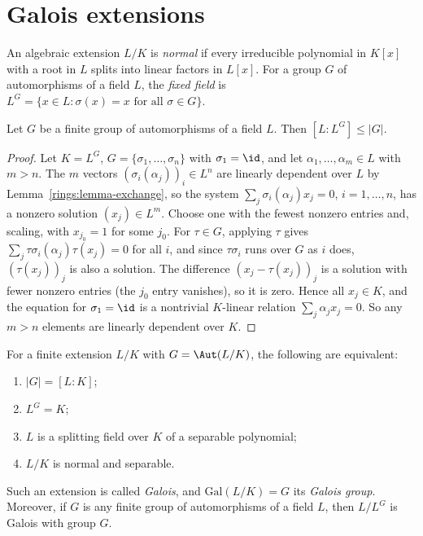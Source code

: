 \section{Galois extensions}\label{fields:section-galois}

\begin{definition}\label{fields:definition-normal}
An algebraic extension $L/K$ is \emph{normal} if every irreducible polynomial in $K[x]$
with a root in $L$ splits into linear factors in $L[x]$. For a group $G$ of automorphisms
of a field $L$, the \emph{fixed field} is $L^G = \{x \in L : \sigma(x) = x \text{ for all } \sigma \in G\}$.
\end{definition}

\begin{lemma}[Artin]\label{fields:lemma-artin}
Let $G$ be a finite group of automorphisms of a field $L$. Then $[L : L^G] \leq |G|$.
\end{lemma}

\begin{proof}
Let $K = L^G$, $G = \{\sigma_1, \ldots, \sigma_n\}$ with $\sigma_1 = \id$, and let
$\alpha_1, \ldots, \alpha_m \in L$ with $m > n$. The $m$ vectors $(\sigma_i(\alpha_j))_i \in L^n$ are linearly
dependent over $L$ by Lemma~\ref{rings:lemma-exchange}, so the system
$\sum_j \sigma_i(\alpha_j) x_j = 0$, $i = 1, \ldots, n$, has a nonzero solution $(x_j) \in L^m$. Choose
one with the fewest nonzero entries and, scaling, with $x_{j_0} = 1$ for some $j_0$. For
$\tau \in G$, applying $\tau$ gives $\sum_j \tau\sigma_i(\alpha_j)\tau(x_j) = 0$ for all $i$, and since
$\tau\sigma_i$ runs over $G$ as $i$ does, $(\tau(x_j))_j$ is also a solution. The difference
$(x_j - \tau(x_j))_j$ is a solution with fewer nonzero entries (the $j_0$ entry vanishes), so it
is zero. Hence all $x_j \in K$, and the equation for $\sigma_1 = \id$ is a nontrivial $K$-linear
relation $\sum_j \alpha_j x_j = 0$. So any $m > n$ elements are linearly dependent over $K$.
\end{proof}

\begin{theorem}\label{fields:theorem-galois-characterisation}
For a finite extension $L/K$ with $G = \Aut(L/K)$, the following are equivalent:
\begin{enumerate}
\item $|G| = [L : K]$;
\item $L^G = K$;
\item $L$ is a splitting field over $K$ of a separable polynomial;
\item $L/K$ is normal and separable.
\end{enumerate}
Such an extension is called \emph{Galois}, and $\mathrm{Gal}(L/K) = G$ its \emph{Galois group}.
Moreover, if $G$ is any finite group of automorphisms of a field $L$, then $L/L^G$ is Galois
with group $G$.
\end{theorem}

